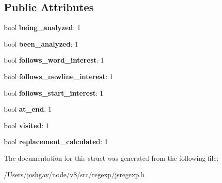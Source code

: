 \subsection*{Public Attributes}
\begin{DoxyCompactItemize}
\item 
bool {\bfseries being\+\_\+analyzed}\+: 1\hypertarget{structv8_1_1internal_1_1_node_info_ae29732b0dc44899a91c2df9c687f5664}{}\label{structv8_1_1internal_1_1_node_info_ae29732b0dc44899a91c2df9c687f5664}

\item 
bool {\bfseries been\+\_\+analyzed}\+: 1\hypertarget{structv8_1_1internal_1_1_node_info_a03902eddc2713d75fc3ac3a82544d736}{}\label{structv8_1_1internal_1_1_node_info_a03902eddc2713d75fc3ac3a82544d736}

\item 
bool {\bfseries follows\+\_\+word\+\_\+interest}\+: 1\hypertarget{structv8_1_1internal_1_1_node_info_af63a381671cda76b6608338e7e020dc5}{}\label{structv8_1_1internal_1_1_node_info_af63a381671cda76b6608338e7e020dc5}

\item 
bool {\bfseries follows\+\_\+newline\+\_\+interest}\+: 1\hypertarget{structv8_1_1internal_1_1_node_info_aef257fa538416d9d0c8d96fc30b3f3f7}{}\label{structv8_1_1internal_1_1_node_info_aef257fa538416d9d0c8d96fc30b3f3f7}

\item 
bool {\bfseries follows\+\_\+start\+\_\+interest}\+: 1\hypertarget{structv8_1_1internal_1_1_node_info_a5deecfa3f3fb5e25fa9502e9b0dbb341}{}\label{structv8_1_1internal_1_1_node_info_a5deecfa3f3fb5e25fa9502e9b0dbb341}

\item 
bool {\bfseries at\+\_\+end}\+: 1\hypertarget{structv8_1_1internal_1_1_node_info_ad16dae437fa8287e274caf3854f220fd}{}\label{structv8_1_1internal_1_1_node_info_ad16dae437fa8287e274caf3854f220fd}

\item 
bool {\bfseries visited}\+: 1\hypertarget{structv8_1_1internal_1_1_node_info_aab006e951efad67bfeeface9eec4094b}{}\label{structv8_1_1internal_1_1_node_info_aab006e951efad67bfeeface9eec4094b}

\item 
bool {\bfseries replacement\+\_\+calculated}\+: 1\hypertarget{structv8_1_1internal_1_1_node_info_af061bd754b39188f421fe14c3d986d88}{}\label{structv8_1_1internal_1_1_node_info_af061bd754b39188f421fe14c3d986d88}

\end{DoxyCompactItemize}


The documentation for this struct was generated from the following file\+:\begin{DoxyCompactItemize}
\item 
/\+Users/joshgav/node/v8/src/regexp/jsregexp.\+h\end{DoxyCompactItemize}
